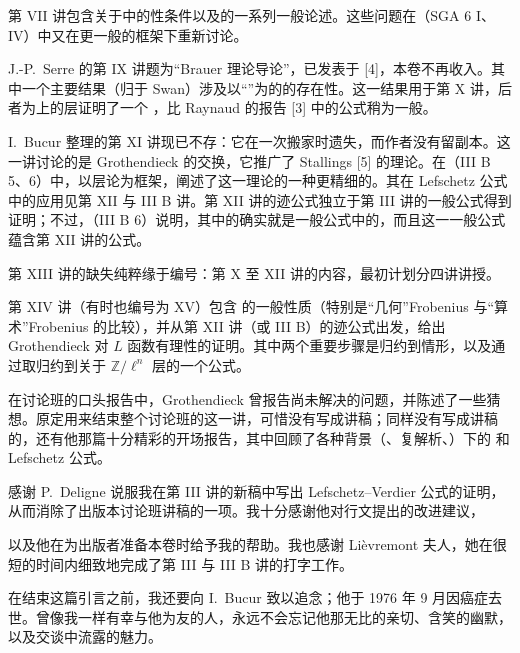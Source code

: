 第 VII 讲包含关于中的性条件以及的一系列一般论述。这些问题在（SGA 6 I、IV）中又在更一般的框架下重新讨论。

J.-P.~Serre 的第 IX 讲题为“Brauer 理论导论”，已发表于 [4]，本卷不再收入。其中一个主要结果（归于 Swan）涉及以“”为的的存在性。这一结果用于第 X 讲，后者为上的层证明了一个 ，比 Raynaud 的报告 [3] 中的公式稍为一般。

I.~Bucur 整理的第 XI 讲现已不存：它在一次搬家时遗失，而作者没有留副本。这一讲讨论的是 Grothendieck 的交换，它推广了 Stallings [5] 的理论。在（III B 5、6）中，以层论为框架，阐述了这一理论的一种更精细的。其在 Lefschetz 公式中的应用见第 XII 与 III B 讲。第 XII 讲的迹公式独立于第 III 讲的一般公式得到证明；不过，（III B 6）说明，其中的确实就是一般公式中的，而且这一一般公式蕴含第 XII 讲的公式。

第 XIII 讲的缺失纯粹缘于编号：第 X 至 XII 讲的内容，最初计划分四讲讲授。

第 XIV 讲（有时也编号为 XV）包含 的一般性质（特别是“几何”Frobenius 与“算术”Frobenius 的比较），并从第 XII 讲（或 III B）的迹公式出发，给出 Grothendieck 对 $L$ 函数有理性的证明。其中两个重要步骤是归约到情形，以及通过取归约到关于 $\mathbb Z/\ell^n$ 层的一个公式。

在讨论班的口头报告中，Grothendieck 曾报告尚未解决的问题，并陈述了一些猜想。原定用来结束整个讨论班的这一讲，可惜没有写成讲稿；同样没有写成讲稿的，还有他那篇十分精彩的开场报告，其中回顾了各种背景（、复解析、）下的 和 Lefschetz 公式。

感谢 P.~Deligne 说服我在第 III 讲的新稿中写出 Lefschetz--Verdier 公式的证明，从而消除了出版本讨论班讲稿的一项。我十分感谢他对行文提出的改进建议，

以及他在为出版者准备本卷时给予我的帮助。我也感谢 Lièvremont 夫人，她在很短的时间内细致地完成了第 III 与 III B 讲的打字工作。

在结束这篇引言之前，我还要向 I.~Bucur 致以追念；他于 1976 年 9 月因癌症去世。曾像我一样有幸与他为友的人，永远不会忘记他那无比的亲切、含笑的幽默，以及交谈中流露的魅力。

